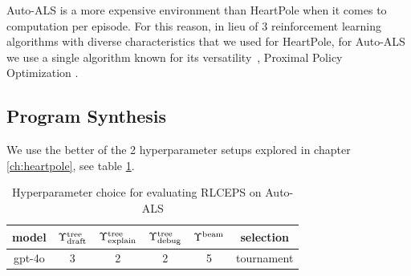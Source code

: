 Auto-ALS is a more expensive environment than HeartPole when it comes to computation per episode.
For this reason, in lieu of 3 reinforcement learning algorithms with diverse characteristics that we used for HeartPole, for Auto-ALS we use a single algorithm known for its versatility~\cite{alaghaTargetLocalizationUsing2022,bilbanOptimizingAutonomousVehicle2025,bohnDeepReinforcementLearning2019,coreccoProximalPolicyOptimizationbased2023,funikaAutomatedCloudResources2023,hasankhaniIntegratedPathPlanning2023,huangImprovingTrafficSignal2023,kalusivalingamOptimizingIndustrialSystems2020,kleinOptimizingParametersSwarm2024,liIntelligentDecisionJoint2025,liuApplicationAdvancedTree2022,lopesIntelligentControlQuadrotor2018,luAdaptiveEnergyManagement2024,maMultiuserMobileEdge2024,maTaskOffloadingScheme2025,mayerModularProductionControl2021,meloLearningHumanoidRobot2019,mengProximalPolicyOptimization2023,ouyangTokenlevelProximalPolicy2024,pinciroliDeepReinforcementLearning2021,proctorProximalPolicyOptimization2021,quangtranProximalPolicyOptimization2020,rehmanReinforcementLearningdrivenProximal2024,silvaControlConventionalContinuous2024,silvaTemporalGraphTraversals2020,vanvuchelenUseProximalPolicy2020,weiMixedautonomyTrafficControl2019,wuCombustionOptimizationStudy2024,wuProximalPolicyOptimization2023,yeAutomatedLaneChange2020,yinHyperheuristicAlgorithmProximal2024,zhangProximalPolicyOptimization2024,zhangRealtimeAutonomousLine2020,zhaoPPOTAAdaptiveTask2023}, Proximal Policy Optimization \cite{schulmanProximalPolicyOptimization2017}. 

\subsection{Program Synthesis}

We use the better of the 2 hyperparameter setups explored in chapter \ref{ch:heartpole}, see table \ref{tab:rlceps-auto-als}.

\begin{table}
    \centering
    \begin{tabular}{|c|c|c|c|c|c|}
        model & $\Upsilon^\text{tree}_\text{draft}$ & $\Upsilon^\text{tree}_\text{explain}$ & $\Upsilon^\text{tree}_\text{debug}$ & $\Upsilon^\text{beam}$ & selection \\
        \midrule
        gpt-4o & 3 & 2 & 2 & 5 & tournament
    \end{tabular}
    \caption{Hyperparameter choice for evaluating RLCEPS on Auto-ALS}
    \label{tab:rlceps-auto-als}
\end{table}

